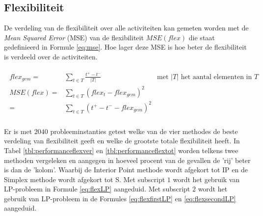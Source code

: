 \subsection{Flexibiliteit}
De verdeling van de flexibiliteit over alle activiteiten kan gemeten worden met de \emph{Mean Squared Error} (MSE) van de flexibiliteit $MSE(flex)$ die staat gedefinieerd in Formule \ref{eq:mse}. Hoe lager deze MSE is hoe beter de flexibiliteit is verdeeld over de activiteiten.

\begin{align}
\label{eq:mse}
\begin{aligned}
    flex_{gem} =& \sum_{t \in T} \frac{t^+ - t^-}{|T|}      & \text{met } |T| \text{ het aantal elementen in } T\\
    MSE(flex) =& \sum_{t \in T} (flex_t - flex_{gem})^2     & \\
               =& \sum_{t \in T} (t^+ - t^- - flex_{gem})^2 & \\
\end{aligned}
\end{align}

Er is met $2040$ probleeminstanties getest welke van de vier methodes de beste verdeling van flexibiliteit geeft en welke de grootste totale flexibiliteit heeft. In Tabel \ref{tbl:performanceflexver} en \ref{tbl:performanceflextot} worden telkens twee methoden vergeleken en aangegen in hoeveel procent van de gevallen de 'rij' beter is dan de 'kolom'. Waarbij de Interior Point methode wordt afgekort tot IP en de Simplex methode wordt afgekort tot S. Met subscript $1$ wordt het gebruik van LP-probleem in Formule \ref{eq:flexLP} aangeduid. Met subscript $2$ wordt het gebruik van LP-probleem in de Formules \ref{eq:flexfirstLP} en \ref{eq:flexsecondLP} aangeduid.

